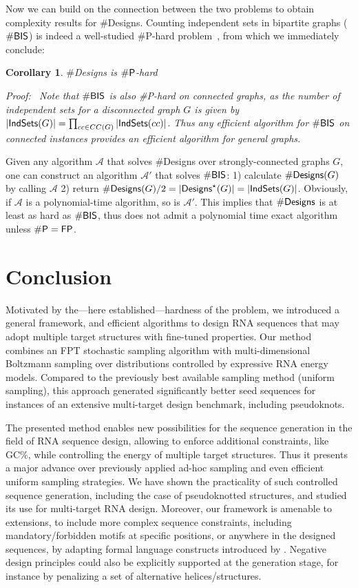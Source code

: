 \documentclass{bmcart}
\newtheorem{corollary}[theorem]{Corollary}
\newenvironment{proof}[1][]{\noindent \em Proof\ifthenelse{\equal{#1}{}}{}{ (#1)}:~}{}
\newcommand{\Design}[1]{{\sf Designs}^{\star}(#1)}
\newcommand{\NumDesign}{\ensuremath{\#}{\sf Designs}\xspace}
\newcommand{\IS}[1]{{\sf IndSets}(#1)}
\newcommand{\Nuc}[1]{{\sf #1}}
\newcommand{\Cb}{\Nuc{C}}
\newcommand{\Gb}{\Nuc{G}}
\newcommand{\GCb}{\Gb\Cb}
\newcommand{\citep}[1]{\cite{#1}}
\newcommand{\citet}[1]{\cite{#1}}
\begin{document}
Now we can build on the connection between the two problems to obtain complexity results for \NumDesign. Counting independent sets in bipartite graphs ($\#{\sf BIS}$) is indeed a well-studied \#{\sf P}-hard problem~\citep{Ge2012}, from which we immediately conclude:
\begin{corollary}
  \NumDesign is $\#{\sf P}$-hard
\end{corollary}
\begin{proof}
  Note that $\#{\sf BIS}$ is also \#{\sf P}-hard on connected graphs, as the number of independent sets for a disconnected graph $G$ is given by $|\IS{G}|=\prod_{cc\in CC(G)} |\IS{cc}|$. Thus any efficient algorithm for $\#{\sf BIS}$ on connected instances provides an efficient algorithm for general graphs.

  Given any algorithm $\mathcal{A}$ that solves \NumDesign over strongly-connected graphs $G$, one can  construct an algorithm $\mathcal{A}'$ that solves $\#{\sf BIS}$: 1) calculate $\NumDesign(G)$ by calling $\mathcal{A}$ 2) return $\NumDesign(G)/2=|\Design{G}| = |\IS{G}|$.
    Obviously, if $\mathcal{A}$ is a polynomial-time algorithm, so is $\mathcal{A'}$.
  This implies that $\NumDesign$  is at least as hard as $\#{\sf BIS}$, thus does not admit a polynomial time exact algorithm unless $\#{\sf P}={\sf FP}$.
\end{proof}

\section*{Conclusion}
Motivated by the---here established---hardness of the problem, we
introduced a general framework, and efficient algorithms to design RNA
sequences that may adopt multiple target structures with fine-tuned
properties. Our method combines an FPT stochastic sampling algorithm
with multi-dimensional Boltzmann sampling over distributions
controlled by expressive RNA energy models.  Compared to the
previously best available sampling method (uniform sampling), this
approach generated significantly better seed sequences for instances
of an extensive multi-target design benchmark, including pseudoknots.

The presented method enables new possibilities for the sequence generation
in the field of RNA sequence design, allowing to enforce additional
constraints, like \GCb\%, while controlling the energy of
multiple target structures. Thus it presents a major advance over
previously applied ad-hoc sampling and even efficient uniform sampling
strategies. We have shown the practicality of such controlled sequence
generation, including the case of pseudoknotted structures, and studied its use for multi-target RNA design. Moreover,
our framework is amenable to extensions, to include more complex sequence
constraints, including mandatory/forbidden motifs at specific
positions, or anywhere in the designed sequences, by adapting formal language constructs
introduced by \citet{Zhou2013}. Negative design principles could also
be explicitly supported at the generation stage, for instance by
penalizing a set of alternative helices/structures.
\end{document}
